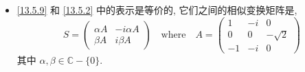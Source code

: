\begin{itemize}
	\item \eqref{13.5.9} 和 \eqref{13.5.2} 中的表示是等价的, 它们之间的相似变换矩阵是,
	\begin{equation}
		S = \begin{pmatrix}
			\alpha A & - i \alpha A \\
			\beta A & i \beta A
		\end{pmatrix} \quad \text{where} \quad A = \begin{pmatrix}
			1 & - i & 0 \\
			0 & 0 & - \sqrt{2} \\
			- 1 & - i & 0
		\end{pmatrix}
	\end{equation}
	其中 $\alpha, \beta \in \mathbb{C} - \{0\}$.
\end{itemize}
